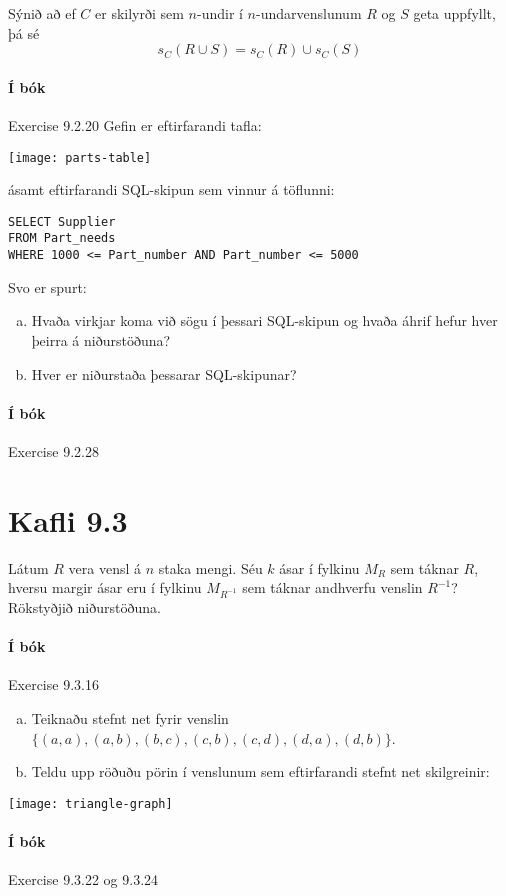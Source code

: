 \documentclass{exam}
\begin{document}
\begin{questions}
\question Sýnið að ef $C$ er skilyrði sem $n$-undir í $n$-undarvenslunum $R$ og $S$ geta uppfyllt, þá sé
\[s_C(R \cup S) = s_C(R)\cup s_C(S)\]

\paragraph{Í bók} Exercise 9.2.20
\newpage
\question Gefin er eftirfarandi tafla:
\begin{center}
\texttt{[image: parts-table]}
\end{center}
ásamt eftirfarandi SQL-skipun sem vinnur á töflunni:
\begin{verbatim}
SELECT Supplier
FROM Part_needs
WHERE 1000 <= Part_number AND Part_number <= 5000
\end{verbatim}
Svo er spurt:

\begin{enumerate}[a)]
 \item Hvaða virkjar koma við sögu í þessari SQL-skipun og hvaða áhrif hefur hver þeirra á niðurstöðuna?
 \item Hver er niðurstaða þessarar SQL-skipunar?
\end{enumerate}

\paragraph{Í bók} Exercise 9.2.28

\section{Kafli 9.3}

\question Látum $R$ vera vensl á $n$ staka mengi. Séu $k$ ásar í fylkinu $M_R$ sem táknar $R$, hversu margir ásar eru í fylkinu $M_{R^{-1}}$ sem táknar andhverfu venslin $R^{-1}$? Rökstyðjið niðurstöðuna.

\paragraph{Í bók} Exercise 9.3.16
\newpage
\question
\begin{enumerate}[a)]
 \item Teiknaðu stefnt net fyrir venslin $\{(a, a), (a, b), (b, c), (c, b), (c, d), (d, a), (d, b)\}$.
 \item Teldu upp röðuðu pörin í venslunum sem eftirfarandi stefnt net skilgreinir:
\end{enumerate}
\begin{center}
 \texttt{[image: triangle-graph]}
\end{center}
\paragraph{Í bók} Exercise 9.3.22 og 9.3.24
\end{questions}
\end{document}
